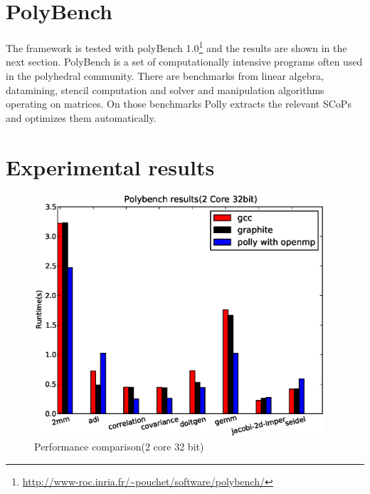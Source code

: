 \label{chap:testing}
\section{PolyBench}
The framework is tested with polyBench 1.0\footnote{\url{http://www-roc.inria.fr/~pouchet/software/polybench/}}
and the results are shown in the next section. PolyBench is a set of computationally intensive programs often
used in the polyhedral community. There are benchmarks from linear algebra, datamining, stencil computation
and solver and manipulation algorithms operating on matrices. On those benchmarks Polly extracts the relevant SCoPs and optimizes them automatically.

\section{Experimental results}
\begin{figure}
\begin{center}
  \includegraphics[height=9cm]{images/2core32bit.eps}
  \caption{Performance comparison(2 core 32 bit)}
  \label{fig:2core1}
\end{center}
\end{figure}

